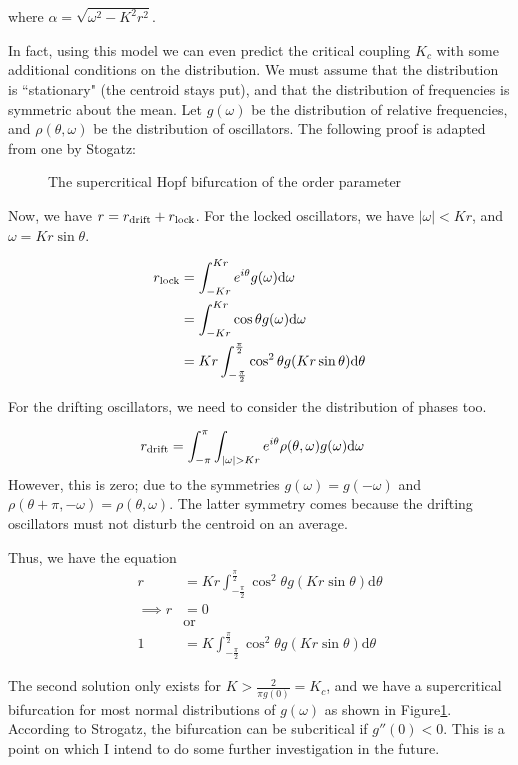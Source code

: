 \documentclass[12pt]{article}
\begin{document}
where $\alpha = \sqrt{\omega ^2-K^2 r^2}$.

In fact, using this model we can even predict the critical coupling $K_c$ with some additional conditions on the distribution. We must assume that the distribution is ``stationary" (the centroid stays put), and that the distribution of frequencies is symmetric about the mean. Let $g(\omega)$ be the distribution of relative frequencies, and $\rho(\theta,\omega)$ be the distribution of oscillators. The following proof is adapted from one by Stogatz\cite{strogatz2000kuramoto}:
\begin{figure}
\centering


\caption{The supercritical Hopf bifurcation of the order parameter}\label{fig:math:bifur}
\end{figure}

Now, we have $r = r_{\rm drift} + r_{\rm lock}$. For the locked oscillators, we have $|\omega|<Kr$, and $\omega=Kr\sin\theta$.

\begin{align*}
r_{\rm lock} &= \int_{-Kr}^{Kr}e^{i\theta}g(\omega)\mathrm d\omega\\
&= \int_{-Kr}^{Kr}\cos\theta g(\omega)\mathrm d\omega\\
&=Kr \int_{-\frac\pi2}^{\frac\pi2}\cos^2\theta g(Kr\sin\theta)\mathrm d\theta
\end{align*}

For the drifting oscillators, we need to consider the distribution of phases too.

\begin{align*}
r_{\rm drift} &= \int_{-\pi}^{\pi}\int_{|\omega|>Kr}e^{i\theta}\rho(\theta,\omega)g(\omega)\mathrm d\omega
\end{align*}
However, this is zero; due to the symmetries $g(\omega)=g(-\omega)$ and $\rho(\theta+\pi,-\omega)=\rho(\theta,\omega)$. The latter symmetry comes because the drifting oscillators must not disturb the centroid on an average.

Thus, we have the equation \begin{align*}
r &=Kr \int_{-\frac\pi2}^{\frac\pi2}\cos^2\theta g(Kr\sin\theta)\mathrm d\theta\\
\implies r &= 0\\
&\text{or} \\
1 &=K \int_{-\frac\pi2}^{\frac\pi2}\cos^2\theta g(Kr\sin\theta)\mathrm d\theta
\end{align*}

The second solution only exists for $K>\frac{2}{\pi g(0)} = K_c$, and we have a supercritical bifurcation for most normal distributions of $g(\omega)$ as shown in Figure\ref{fig:math:bifur}. According to Strogatz\cite{strogatz2000kuramoto}, the bifurcation can be subcritical if $g''(0) < 0$. This is a point on which I intend to do some further investigation in the future.
\end{document}
